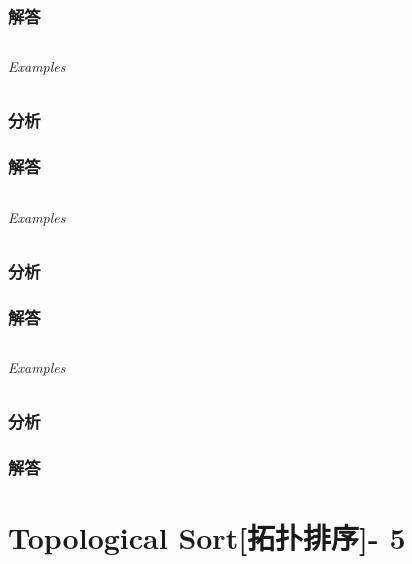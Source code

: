 \documentclass[UTF8,a4paper,12pt]{ctexbook}
\begin{document}
	\subsection{解答}
	
\section{}
	
	\subparagraph{Examples}
	
	\subsection{分析}
	
	\subsection{解答}
	
\section{}
	
	\subparagraph{Examples}
	
	\subsection{分析}
	
	\subsection{解答}
	
\section{}
	
	\subparagraph{Examples}
	
	\subsection{分析}
	
	\subsection{解答}
\chapter{Topological Sort[拓扑排序]- 5}
\section{}
	
\end{document}
